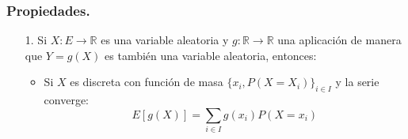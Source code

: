\subsubsection{Propiedades.}
\begin{itemize}
\item[1.]Si $X:E\to\mathbb{R}$ es una variable aleatoria y $g: \mathbb{R}\to\mathbb{R}$ una aplicación de manera que $Y=g(X)$ es también una variable aleatoria, entonces:
\begin{itemize}
\item Si $X$ es discreta con función de masa $\{x_{i},P(X=X_{i})\}_{i\in I}$ y la serie converge:
\[E[g(X)]=\sum_{i\in I}g(x_{i})P(X=x_{i})\]
\end{itemize}
\end{itemize}
